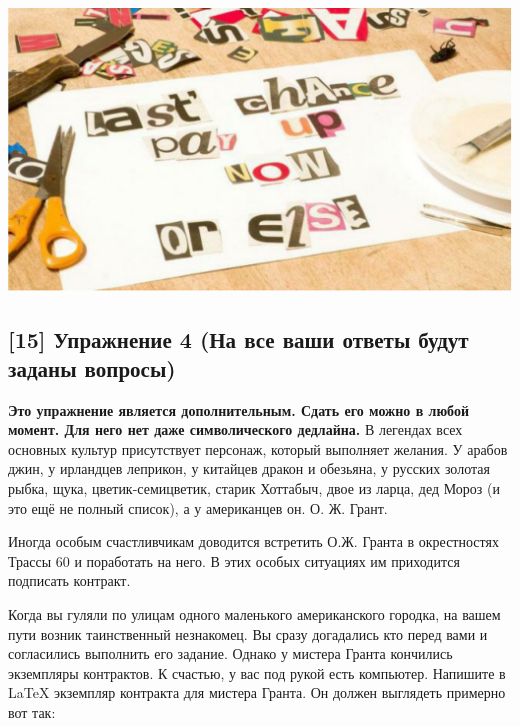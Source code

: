 \documentclass[12pt, a4paper, oneside]{article}
\begin{document}
\begin{center}
\includegraphics[scale=0.2]{letters.png}
\end{center} 


\subsection*{[15]  Упражнение 4 (На все ваши ответы будут заданы вопросы)}

\textbf{Это упражнение  является дополнительным. Сдать его можно в любой момент. Для него нет даже символического дедлайна.}  В легендах всех основных культур присутствует персонаж, который выполняет желания. У арабов джин, у ирландцев леприкон, у китайцев дракон и обезьяна, у русских золотая рыбка, щука, цветик-семицветик, старик Хоттабыч, двое из ларца, дед Мороз (и это ещё не полный список), а у американцев он. О. Ж. Грант.

Иногда особым счастливчикам доводится встретить О.Ж. Гранта в окрестностях Трассы 60 и поработать на него. В этих особых ситуациях им приходится подписать контракт.

Когда вы гуляли по улицам одного маленького американского городка, на вашем пути возник таинственный незнакомец. Вы сразу догадались кто перед вами и согласились выполнить его задание. Однако у мистера Гранта кончились экземпляры контрактов. К счастью, у вас под рукой есть компьютер. Напишите в \LaTeX{} экземпляр контракта для мистера Гранта. Он должен выглядеть примерно вот так:
\end{document}
